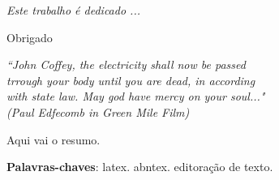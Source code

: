 \documentclass[
	12pt,				%
	openright,			%
	oneside,			%
	a4paper,			%
	english,			%
	french,				%
	spanish,			%
	brazil				%
	]{abntex2}
\begin{document}
\frenchspacing 


\imprimircapa
\imprimirfolhaderosto*

\begin{dedicatoria}
   \vspace*{\fill}
   \centering
   \noindent
   \textit{ Este trabalho é dedicado ...} \vspace*{\fill}
\end{dedicatoria}

\begin{agradecimentos}
Obrigado

\end{agradecimentos}

\begin{epigrafe}
    \vspace*{\fill}
	\begin{flushright}
		\textit{``John Coffey, the electricity shall now be passed \\
		trrough your body until you are dead, in according\\
		with state law. May god have mercy on your soul..."\\
		(Paul Edfecomb in Green Mile Film)}
	\end{flushright}
\end{epigrafe}


\setlength{\absparsep}{18pt} %
\begin{resumo}
Aqui vai o resumo.

 \textbf{Palavras-chaves}: latex. abntex. editoração de texto.
\end{resumo}
\end{document}
